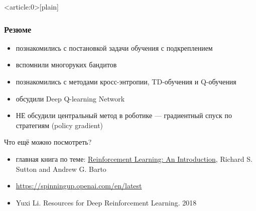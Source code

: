 \documentclass[fullscreen=true, bookmarks=true, hyperref={pdfencoding=unicode}]{beamer}
\begin{document}
{ %
    \begin{frame}<article:0>[plain]
     \end{frame}
}


\begin{frame}[t]
  \frametitle{Резюме}

  \begin{itemize}
    \item познакомились с постановкой задачи обучения с подкреплением
    \item вспомнили многоруких бандитов
    \item познакомились с методами кросс-энтропии, TD-обучения и Q-обучения
    \item обсудили Deep Q-learning Network
    \item НЕ обсудили центральный метод в роботике — градиентный спуск по стратегиям (policy gradient)
  \end{itemize}
  \vspace{0.5cm}
  \pause
  Что ещё можно посмотреть?

  \begin{itemize}
    \item главная книга по теме: \href{https://web.stanford.edu/class/psych209/Readings/SuttonBartoIPRLBook2ndEd.pdf}{Reinforcement Learning: An Introduction}, Richard S. Sutton and Andrew G. Barto
    \item \href{https://spinningup.openai.com/en/latest}{https://spinningup.openai.com/en/latest}
    \item Yuxi Li. Resources for Deep Reinforcement Learning. 2018
  \end{itemize}
\end{frame}
\end{document}
